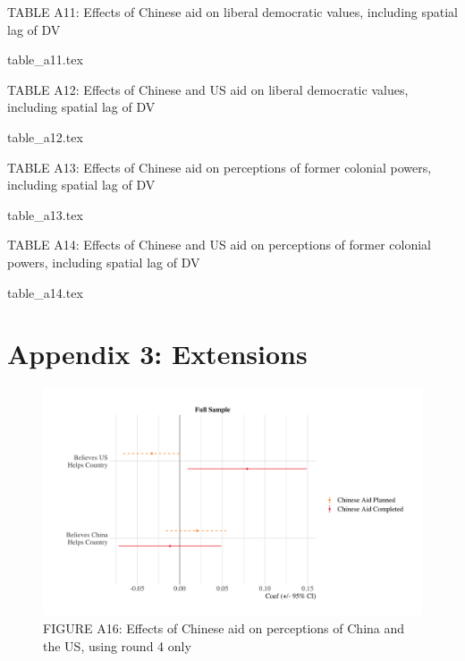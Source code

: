 \documentclass[9pt]{article}
\begin{document}
\newpage %

\setlength{\tabcolsep}{5pt}
\begin{table}[H]
\caption{TABLE A11: Effects of Chinese aid on liberal democratic values, including spatial lag of DV}
\label{reg}
\centering
{table_a11.tex}
\end{table}

\setlength{\tabcolsep}{5pt}
\begin{table}[H]
\caption{TABLE A12: Effects of Chinese and US aid on liberal democratic values, including spatial lag of DV}
\label{reg}
\centering
{table_a12.tex}
\end{table}

\newpage %

\setlength{\tabcolsep}{5pt}
\begin{table}[H]
\caption{TABLE A13: Effects of Chinese aid on perceptions of former colonial powers, including spatial lag of DV}
\label{reg}
\centering
{table_a13.tex}
\end{table}

\setlength{\tabcolsep}{5pt}
\begin{table}[H]
\caption{TABLE A14: Effects of Chinese and US aid on perceptions of former colonial powers, including spatial lag of DV}
\label{reg}
\centering
{table_a14.tex}
\end{table}

\newpage
\section{Appendix 3: Extensions}

\begin{figure}[H]
\centering
\includegraphics[width=1\textwidth]{figures/figure_a16.png}
\caption{FIGURE A16: Effects of Chinese aid on perceptions of China and the US, using round 4 only}
\end{figure}
\end{document}
